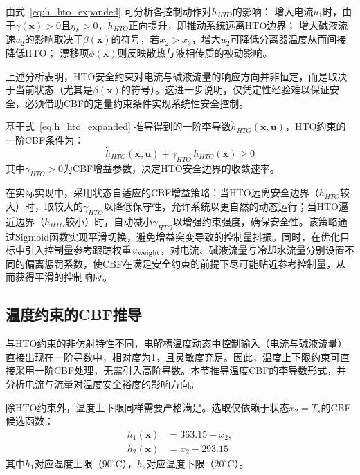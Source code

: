 由式~\eqref{eq:h_hto_expanded} 可分析各控制动作对$\dot{h}_{HTO}$的影响：
增大电流$u_1$时，由于$\gamma(\mathbf{x})>0$且$\eta_F>0$，$\dot{h}_{HTO}$正向提升，即推动系统远离HTO边界；
增大碱液流速$u_2$的影响取决于$\beta(\mathbf{x})$的符号，若$x_2 > x_3$，增大$u_2$可降低分离器温度从而间接降低HTO；
漂移项$\phi(\mathbf{x})$则反映散热与液相传质的被动影响。

上述分析表明，HTO安全约束对电流与碱液流量的响应方向并非恒定，而是取决于当前状态（尤其是$\beta(\mathbf{x})$的符号）。这进一步说明，仅凭定性经验难以保证安全，必须借助CBF的定量约束条件实现系统性安全控制。

基于式~\eqref{eq:h_hto_expanded} 推导得到的一阶李导数$\dot{h}_{HTO}(\mathbf{x}, \mathbf{u})$，HTO约束的一阶CBF条件为：
\begin{equation}
  \dot{h}_{HTO}(\mathbf{x}, \mathbf{u}) + \gamma_{HTO} \, h_{HTO}(\mathbf{x}) \ge 0
\label{eq:cbf_hto}
\end{equation}
其中$\gamma_{HTO} > 0$为CBF增益参数，决定HTO安全边界的收敛速率。

在实际实现中，采用状态自适应的CBF增益策略：当HTO远离安全边界（$h_{HTO}$较大）时，取较大的$\gamma_{HTO}$以降低保守性，允许系统以更自然的动态运行；当HTO逼近边界（$h_{HTO}$较小）时，自动减小$\gamma_{HTO}$以增强约束强度，确保安全性。该策略通过Sigmoid函数实现平滑切换，避免增益突变导致的控制量抖振。同时，在优化目标中引入控制量参考跟踪权重$u_{\rm weight}$，对电流、碱液流量与冷却水流量分别设置不同的偏离惩罚系数，使CBF在满足安全约束的前提下尽可能贴近参考控制量，从而获得平滑的控制响应。

\subsection{温度约束的CBF推导}

与HTO约束的非仿射特性不同，电解槽温度动态中控制输入（电流与碱液流量）直接出现在一阶导数中，相对度为1，且灵敏度充足。因此，温度上下限约束可直接采用一阶CBF处理，无需引入高阶导数。本节推导温度CBF的李导数形式，并分析电流与流量对温度安全裕度的影响方向。

除HTO约束外，温度上下限同样需要严格满足。选取仅依赖于状态$x_2 = T_s$的CBF候选函数：
\begin{equation}
  \begin{aligned}
    h_1(\mathbf{x}) &= 363.15 - x_2, \\
    h_2(\mathbf{x}) &= x_2 - 293.15
  \end{aligned}
  \label{eq:h_temperature}
\end{equation}
其中$h_1$对应温度上限（$90^\circ$C），$h_2$对应温度下限（$20^\circ$C）。

